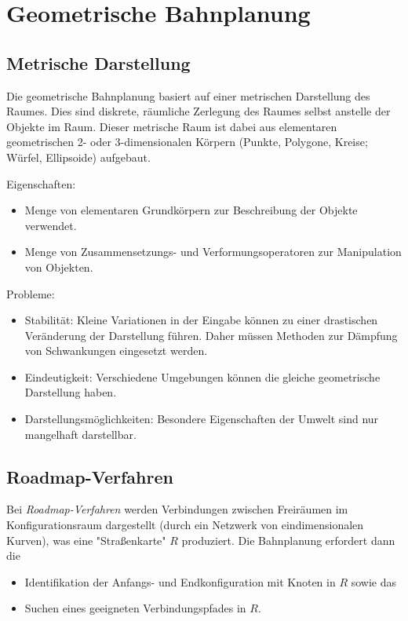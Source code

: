 	\section{Geometrische Bahnplanung}
		\subsection{Metrische Darstellung}
			Die geometrische Bahnplanung basiert auf einer metrischen Darstellung des Raumes. Dies sind diskrete, räumliche Zerlegung des Raumes selbst anstelle der Objekte im Raum. Dieser metrische Raum ist dabei aus elementaren geometrischen 2- oder 3-dimensionalen Körpern (Punkte, Polygone, Kreise; Würfel, Ellipsoide) aufgebaut.

			Eigenschaften:
			\begin{itemize}
				\item Menge von elementaren Grundkörpern zur Beschreibung der Objekte verwendet.
				\item Menge von Zusammensetzungs- und Verformungsoperatoren zur Manipulation von Objekten.
			\end{itemize}

			Probleme:
			\begin{itemize}
				\item Stabilität: Kleine Variationen in der Eingabe können zu einer drastischen Veränderung der Darstellung führen. Daher müssen Methoden zur Dämpfung von Schwankungen eingesetzt werden.
				\item Eindeutigkeit: Verschiedene Umgebungen können die gleiche geometrische Darstellung haben.
				\item Darstellungsmöglichkeiten: Besondere Eigenschaften der Umwelt sind \mglw nur mangelhaft darstellbar.
			\end{itemize}

		\subsection{Roadmap-Verfahren}
			Bei \emph{Roadmap-Verfahren} werden Verbindungen zwischen Freiräumen im Konfigurationsraum dargestellt (durch ein Netzwerk von eindimensionalen Kurven), was eine "Straßenkarte" \(R\) produziert. Die Bahnplanung erfordert dann die
			\begin{itemize}
				\item Identifikation der Anfangs- und Endkonfiguration mit Knoten in \(R\) sowie das
				\item Suchen eines geeigneten Verbindungspfades in \(R\).
			\end{itemize}

